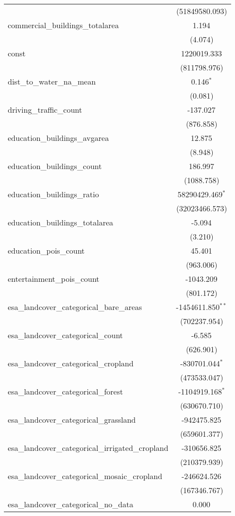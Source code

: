 \begin{table}[!htbp]
\begin{tabular}{@{\extracolsep{5pt}}lc}
  & (51849580.093) \\
 commercial_buildings_totalarea & 1.194$^{}$ \\
  & (4.074) \\
 const & 1220019.333$^{}$ \\
  & (811798.976) \\
 dist_to_water_na_mean & 0.146$^{*}$ \\
  & (0.081) \\
 driving_traffic_count & -137.027$^{}$ \\
  & (876.858) \\
 education_buildings_avgarea & 12.875$^{}$ \\
  & (8.948) \\
 education_buildings_count & 186.997$^{}$ \\
  & (1088.758) \\
 education_buildings_ratio & 58290429.469$^{*}$ \\
  & (32023466.573) \\
 education_buildings_totalarea & -5.094$^{}$ \\
  & (3.210) \\
 education_pois_count & 45.401$^{}$ \\
  & (963.006) \\
 entertainment_pois_count & -1043.209$^{}$ \\
  & (801.172) \\
 esa_landcover_categorical_bare_areas & -1454611.850$^{**}$ \\
  & (702237.954) \\
 esa_landcover_categorical_count & -6.585$^{}$ \\
  & (626.901) \\
 esa_landcover_categorical_cropland & -830701.044$^{*}$ \\
  & (473533.047) \\
 esa_landcover_categorical_forest & -1104919.168$^{*}$ \\
  & (630670.710) \\
 esa_landcover_categorical_grassland & -942475.825$^{}$ \\
  & (659601.377) \\
 esa_landcover_categorical_irrigated_cropland & -310656.825$^{}$ \\
  & (210379.939) \\
 esa_landcover_categorical_mosaic_cropland & -246624.526$^{}$ \\
  & (167346.767) \\
 esa_landcover_categorical_no_data & 0.000$^{}$ \\

\end{tabular}
\end{table}
